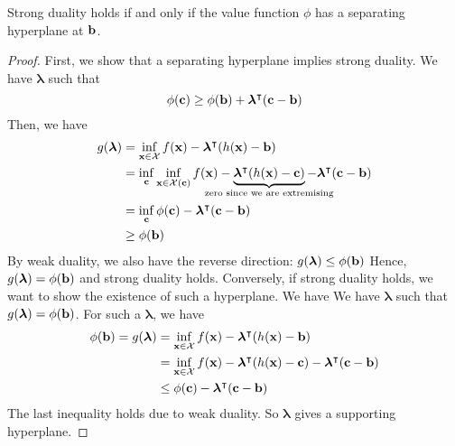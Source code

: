 \begin{theorem}
	Strong duality holds if and only if the value function \( \phi \) has a separating hyperplane at \( \vb b \).
\end{theorem}
\begin{proof}
	First, we show that a separating hyperplane implies strong duality.
	We have \( \bm \lambda \) such that
	\[
		\phi(\vb c) \geq \phi(\vb b) + \bm\lambda^\intercal (\vb c - \vb b)
	\]
	Then, we have
	\begin{align*}
		g(\bm \lambda) & = \inf_{\vb x \in \mathcal X} f(\vb x) - \bm\lambda^\transpose (h(\vb x) - \vb b)                                                                                                                           \\
		               & = \inf_{\vb c} \inf_{\vb x \in \mathcal X(\vb c)} f(\vb x) - \underbrace{\bm\lambda^\transpose (h(\vb x) - \vb c)}_{\mathclap{\text{zero since we are extremising}}} - \bm\lambda^\transpose(\vb c - \vb b) \\
		               & = \inf_{\vb c} \phi(\vb c) - \bm\lambda^\transpose(\vb c - \vb b)                                                                                                                                           \\
		               & \geq \phi(\vb b)
	\end{align*}
	By weak duality, we also have the reverse direction: \( g(\bm \lambda) \leq \phi(\vb b) \)
	Hence, \( g(\bm \lambda) = \phi(\vb b) \) and strong duality holds.
	Conversely, if strong duality holds, we want to show the existence of such a hyperplane.
	We have We have \( \bm \lambda \) such that \( g(\bm \lambda) = \phi(\vb b) \).
	For such a \( \bm \lambda \), we have
	\begin{align*}
		\phi(\vb b) = g(\bm \lambda) & = \inf_{\vb x \in \mathcal X} f(\vb x) - \bm\lambda^\intercal (h(\vb x) - \vb b)                                        \\
		                             & = \inf_{\vb x \in \mathcal X} f(\vb x) - \bm\lambda^\intercal (h(\vb x) - \vb c) - \bm\lambda^\intercal(\vb c - \vb b) \\
		                             & \leq \phi(\vb c) - \bm\lambda^\intercal(\vb c - \vb b)
	\end{align*}
	The last inequality holds due to weak duality.
	So \( \bm \lambda \) gives a supporting hyperplane.
\end{proof}

